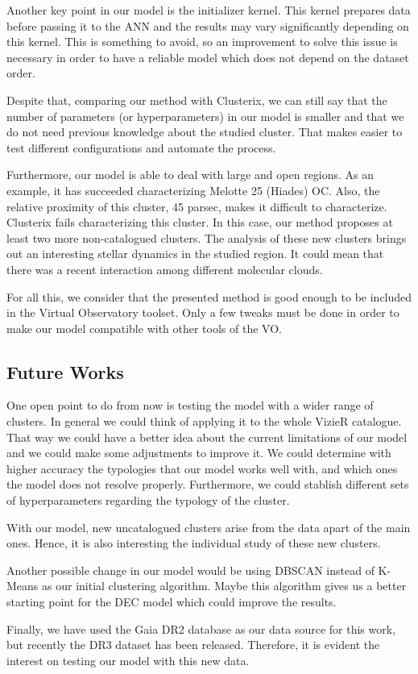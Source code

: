 \documentclass[11pt,a4paper,english,twocolumn]{article}
\begin{document}
Another key point in our model is the initializer kernel.
This kernel prepares data before passing it to the ANN
and the results may vary significantly depending on this kernel.
This is something to avoid, so an improvement to solve this issue is necessary
in order to have a reliable model which does not depend on the dataset order.

Despite that, comparing our method with Clusterix, we can still say that the
number of parameters (or hyperparameters) in our model is smaller and that
we do not need previous knowledge about the studied cluster.
That makes easier to test different configurations and automate the process.

Furthermore, our model is able to deal with large and open regions. As an example,
it has succeeded characterizing Melotte 25 (Hiades) OC. Also, the relative proximity
of this cluster, 45 parsec, makes it difficult to characterize. Clusterix fails
characterizing this cluster. In this case, our method proposes at least two more
non-catalogued clusters. The analysis of these new clusters brings out an interesting
stellar dynamics in the studied region. It could mean that there was a recent
interaction among different molecular clouds.

For all this, we consider that the presented method is good enough to be included
in the Virtual Observatory toolset. Only a few tweaks must be done in order to make
our model compatible with other tools of the VO.

\subsection{Future Works}

One open point to do from now is testing the model with a wider range of clusters.
In general we could think of applying it to the whole VizieR catalogue.
That way we could have a better idea about the current limitations of our model
and we could make some adjustments to improve it. We could determine with higher
accuracy the typologies that our model works well with, and which ones the model
does not resolve properly. Furthermore, we could stablish different sets of
hyperparameters regarding the typology of the cluster.

With our model, new uncatalogued clusters arise from the data apart of the main ones.
Hence, it is also interesting the individual study of these new clusters.

Another possible change in our model would be using DBSCAN instead of K-Means
as our initial clustering algorithm. Maybe this algorithm gives us a better starting
point for the DEC model which could improve the results.

Finally, we have used the Gaia DR2 database as our data source for this work,
but recently the DR3 dataset has been released.
Therefore, it is evident the interest on testing our model with this new data.

\renewcommand{\refname}{References}


\end{document}
